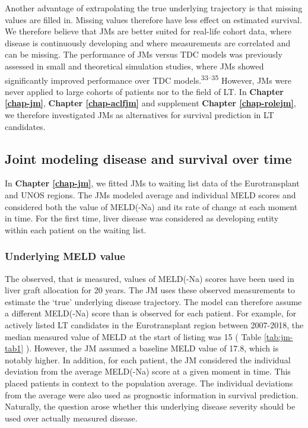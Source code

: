 \documentclass[11pt,english,]{book} %
\begin{document}
Another advantage of extrapolating the true underlying trajectory is that missing values are filled in. Missing values therefore have less effect on estimated survival. We therefore believe that JMs are better suited for real-life cohort data, where disease is continuously developing and where measurements are correlated and can be missing. The performance of JMs versus TDC models was previously assessed in small and theoretical simulation studies, where JMs showed significantly improved performance over TDC models.\textsuperscript{33--35} However, JMs were never applied to large cohorts of patients nor to the field of LT. In \textbf{Chapter \ref{chap-jm}}, \textbf{Chapter \ref{chap-aclfjm}} and supplement \textbf{Chapter \ref{chap-rolejm}}, we therefore investigated JMs as alternatives for survival prediction in LT candidates.

\hypertarget{joint-modeling-disease-and-survival-over-time}{%
\subsection*{Joint modeling disease and survival over time}\label{joint-modeling-disease-and-survival-over-time}}

In \textbf{Chapter \ref{chap-jm}}, we fitted JMs to waiting list data of the Eurotransplant and UNOS regions. The JMs modeled average and individual MELD scores and considered both the value of MELD(-Na) and its rate of change at each moment in time. For the first time, liver disease was considered as developing entity within each patient on the waiting list.

\hypertarget{underlying-meld-value}{%
\subsubsection*{Underlying MELD value}\label{underlying-meld-value}}

The observed, that is measured, values of MELD(-Na) scores have been used in liver graft allocation for 20 years. The JM uses these observed measurements to estimate the `true' underlying disease trajectory. The model can therefore assume a different MELD(-Na) score than is observed for each patient. For example, for actively listed LT candidates in the Eurotransplant region between 2007-2018, the median measured value of MELD at the start of listing was 15 ( Table \ref{tab:jm-tab1} ). However, the JM assumed a baseline MELD value of 17.8, which is notably higher. In addition, for each patient, the JM considered the individual deviation from the average MELD(-Na) score at a given moment in time. This placed patients in context to the population average. The individual deviations from the average were also used as prognostic information in survival prediction. Naturally, the question arose whether this underlying disease severity should be used over actually measured disease.
\end{document}
